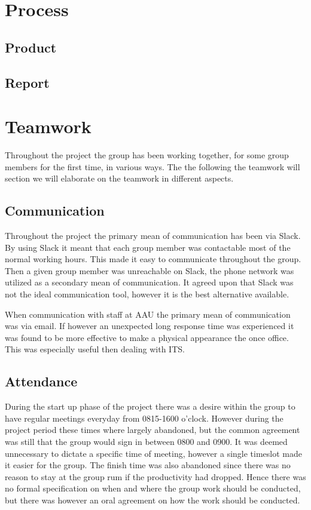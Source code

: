 \section{Process}

\subsection{Product}

\subsection{Report}

\section{Teamwork}
Throughout the project the group has been working together, for some group members for the first time, in various ways. 
The the following the teamwork will section we will elaborate on the teamwork in different aspects. 

\subsection{Communication}
Throughout the project the primary mean of communication has been via Slack. 
By using Slack it meant that each group member was contactable most of the normal working hours.
This made it easy to communicate throughout the group. 
Then a given group member was unreachable on Slack, the phone network was utilized as a secondary mean of communication.
It agreed upon that Slack was not the ideal communication tool, however it is the best alternative available.

When communication with staff at AAU the primary mean of communication was via email.
If however an unexpected long response time was experienced it was found to be more effective to make a physical appearance the once office.
This was especially useful then dealing with ITS.

\subsection{Attendance}
During the start up phase of the project there was a desire within the group to have regular meetings everyday from 0815-1600 o'clock.
However during the project period these times where largely abandoned, but the common agreement was still that the group would sign in between 0800 and 0900.
It was deemed unnecessary to dictate a specific time of meeting, however a single timeslot made it easier for the group. 
The finish time was also abandoned since there was no reason to stay at the group rum if the productivity had dropped.
Hence there was no formal specification on when and where the group work should be conducted, but there was however an oral agreement on how the work should be conducted.